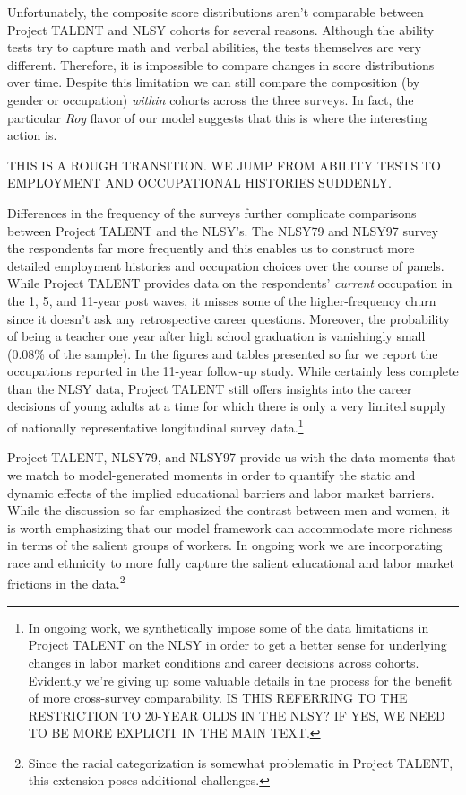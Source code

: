 \documentclass[onehalfspacing,11pt]{article}
\begin{document}
Unfortunately, the composite score distributions aren't comparable between Project TALENT and NLSY cohorts for several reasons. Although the ability tests try to capture math and verbal abilities, the tests themselves are very different. Therefore, it is impossible to compare changes in score distributions over time. Despite this limitation we can still compare the composition (by gender or occupation) {\it within} cohorts across the three surveys. In fact, the particular {\it Roy} flavor of our model suggests that this is where the interesting action is.

THIS IS A ROUGH TRANSITION. WE JUMP FROM ABILITY TESTS TO EMPLOYMENT AND OCCUPATIONAL HISTORIES SUDDENLY.

Differences in the frequency of the surveys further complicate comparisons between Project TALENT and the NLSY's. The NLSY79 and NLSY97 survey the respondents far more frequently and this enables us to construct more detailed employment histories and occupation choices over the course of panels. While Project TALENT provides data on the respondents' {\it current} occupation in the 1, 5, and 11-year post waves, it misses some of the higher-frequency churn since it doesn't ask any retrospective career questions. Moreover, the probability of being a teacher one year after high school graduation is vanishingly small (0.08\% of the sample). In the figures and tables presented so far we report the occupations reported in the 11-year follow-up study. While certainly less complete than the NLSY data, Project TALENT still offers insights into the career decisions of young adults at a time for which there is only a very limited supply of nationally representative longitudinal survey data.\footnote{In ongoing work, we synthetically impose some of the data limitations in Project TALENT on the NLSY in order to get a better sense for underlying changes in labor market conditions and career decisions across cohorts. Evidently we're giving up some valuable details in the process for the benefit of more cross-survey comparability. IS THIS REFERRING TO THE RESTRICTION TO 20-YEAR OLDS IN THE NLSY? IF YES, WE NEED TO BE MORE EXPLICIT IN THE MAIN TEXT.}

Project TALENT, NLSY79, and NLSY97 provide us with the data moments that we match to model-generated moments in order to quantify the static and dynamic effects of the implied educational barriers and labor market barriers. While the discussion so far emphasized the contrast between men and women, it is worth emphasizing that our model framework can accommodate more richness in terms of the salient groups of workers. In ongoing work we are incorporating race and ethnicity to more fully capture the salient educational and labor market frictions in the data.\footnote{Since the racial categorization is somewhat problematic in Project TALENT, this extension poses additional challenges.}
\end{document}
